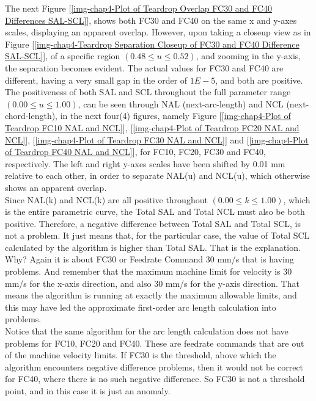 The next Figure [\ref{img-chap4-Plot of Teardrop Overlap FC30 and FC40 Differences SAL-SCL}], shows both FC30 and FC40 on the same x and y-axes scales, displaying an apparent overlap. However, upon taking a closeup view as in Figure [\ref{img-chap4-Teardrop Separation Closeup of FC30 and FC40 Difference SAL-SCL}], of a specific region $(0.48 \le u \le 0.52)$, and zooming in the y-axis, the separation becomes evident. The actual values for FC30 and FC40 are different, having a very small gap in the order of $1E-5$, and both are positive.  \\    

The positiveness of both SAL and SCL throughout the full parameter range $(0.00 \le u \le 1.00)$, can be seen through NAL (next-arc-length) and NCL (next-chord-length), in the next four(4) figures, namely Figure [\ref{img-chap4-Plot of Teardrop FC10 NAL and NCL}], [\ref{img-chap4-Plot of Teardrop FC20 NAL and NCL}], [\ref{img-chap4-Plot of Teardrop FC30 NAL and NCL}] and [\ref{img-chap4-Plot of Teardrop FC40 NAL and NCL}], for FC10, FC20, FC30 and FC40, respectively. The left and right y-axes scales have been shifted by 0.01 mm relative to each other, in order to separate NAL(u) and NCL(u), which otherwise shows an apparent overlap. \\ 




Since NAL(k) and NCL(k) are all positive throughout $(0.00 \le k \le 1.00)$, which is the entire parametric curve, the Total SAL and Total NCL must also be both positive. Therefore, a negative difference between Total SAL and Total SCL, is not a problem. It just means that, for the particular case, the value of Total SCL calculated by the algorithm is higher than Total SAL. That is the explanation. \\

Why? Again it is about FC30 or Feedrate Command 30 mm/s that is having problems. And remember that the maximum machine limit for velocity is 30 mm/s for the x-axis direction, and also 30 mm/s for the y-axis direction. That means the algorithm is running at exactly the maximum allowable limits, and this may have led the approximate first-order arc length calculation into problems. \\

Notice that the same algorithm for the arc length calculation does not have problems for FC10, FC20 and FC40. These are feedrate commands that are out of the machine velocity limits. If FC30 is the threshold, above which the algorithm encounters negative difference problems, then it would not be correct for FC40, where there is no such negative difference. So FC30 is not a threshold point, and in this case it is just an anomaly. \\

